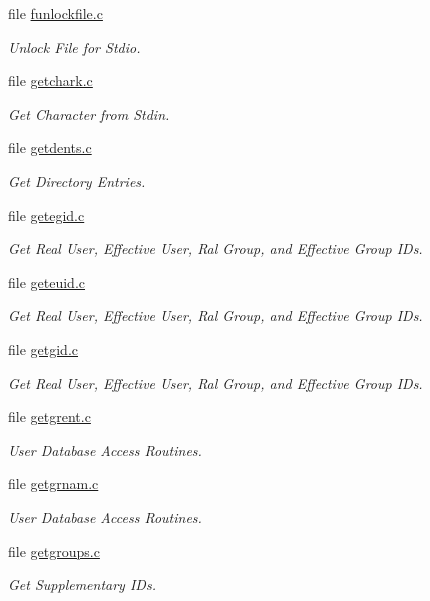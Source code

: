 \begin{DoxyCompactItemize}
file \mbox{\hyperlink{funlockfile_8c}{funlockfile.\+c}}
\begin{DoxyCompactList}\small\item\em Unlock File for Stdio. \end{DoxyCompactList}\item 
file \mbox{\hyperlink{getchark_8c}{getchark.\+c}}
\begin{DoxyCompactList}\small\item\em Get Character from Stdin. \end{DoxyCompactList}\item 
file \mbox{\hyperlink{getdents_8c}{getdents.\+c}}
\begin{DoxyCompactList}\small\item\em Get Directory Entries. \end{DoxyCompactList}\item 
file \mbox{\hyperlink{getegid_8c}{getegid.\+c}}
\begin{DoxyCompactList}\small\item\em Get Real User, Effective User, Ral Group, and Effective Group I\+Ds. \end{DoxyCompactList}\item 
file \mbox{\hyperlink{geteuid_8c}{geteuid.\+c}}
\begin{DoxyCompactList}\small\item\em Get Real User, Effective User, Ral Group, and Effective Group I\+Ds. \end{DoxyCompactList}\item 
file \mbox{\hyperlink{getgid_8c}{getgid.\+c}}
\begin{DoxyCompactList}\small\item\em Get Real User, Effective User, Ral Group, and Effective Group I\+Ds. \end{DoxyCompactList}\item 
file \mbox{\hyperlink{getgrent_8c}{getgrent.\+c}}
\begin{DoxyCompactList}\small\item\em User Database Access Routines. \end{DoxyCompactList}\item 
file \mbox{\hyperlink{getgrnam_8c}{getgrnam.\+c}}
\begin{DoxyCompactList}\small\item\em User Database Access Routines. \end{DoxyCompactList}\item 
file \mbox{\hyperlink{getgroups_8c}{getgroups.\+c}}
\begin{DoxyCompactList}\small\item\em Get Supplementary I\+Ds. \end{DoxyCompactList}\item 

\end{DoxyCompactItemize}
